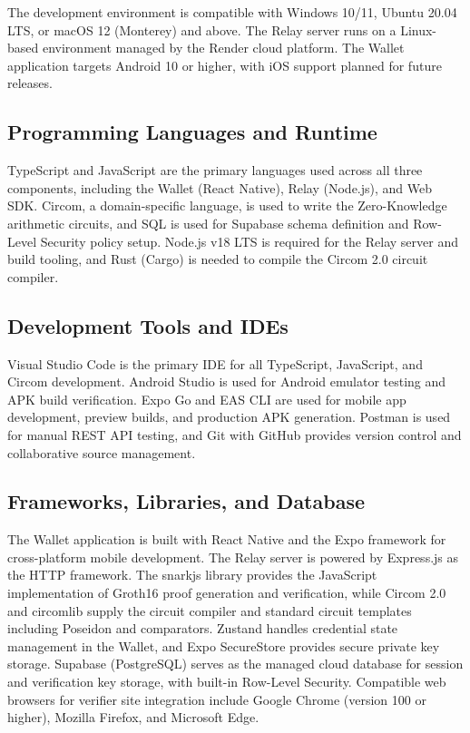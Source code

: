 The development environment is compatible with Windows 10/11, Ubuntu 20.04 LTS, or macOS 12 (Monterey) and above. The Relay server runs on a Linux-based environment managed by the Render cloud platform. The Wallet application targets Android 10 or higher, with iOS support planned for future releases.

\subsection{Programming Languages and Runtime}

TypeScript and JavaScript are the primary languages used across all three components, including the Wallet (React Native), Relay (Node.js), and Web SDK. Circom, a domain-specific language, is used to write the Zero-Knowledge arithmetic circuits, and SQL is used for Supabase schema definition and Row-Level Security policy setup. Node.js v18 LTS is required for the Relay server and build tooling, and Rust (Cargo) is needed to compile the Circom 2.0 circuit compiler.

\subsection{Development Tools and IDEs}

Visual Studio Code is the primary IDE for all TypeScript, JavaScript, and Circom development. Android Studio is used for Android emulator testing and APK build verification. Expo Go and EAS CLI are used for mobile app development, preview builds, and production APK generation. Postman is used for manual REST API testing, and Git with GitHub provides version control and collaborative source management.

\subsection{Frameworks, Libraries, and Database}

The Wallet application is built with React Native and the Expo framework for cross-platform mobile development. The Relay server is powered by Express.js as the HTTP framework. The snarkjs library provides the JavaScript implementation of Groth16 proof generation and verification, while Circom 2.0 and circomlib supply the circuit compiler and standard circuit templates including Poseidon and comparators. Zustand handles credential state management in the Wallet, and Expo SecureStore provides secure private key storage. Supabase (PostgreSQL) serves as the managed cloud database for session and verification key storage, with built-in Row-Level Security. Compatible web browsers for verifier site integration include Google Chrome (version 100 or higher), Mozilla Firefox, and Microsoft Edge.

